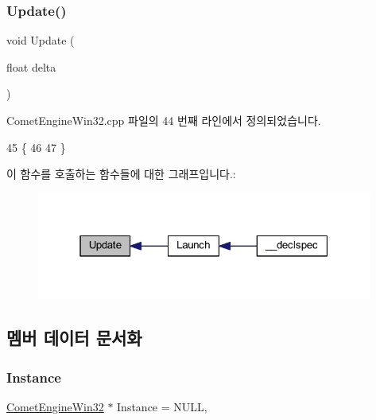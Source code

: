 \subsubsection{\texorpdfstring{Update()}{Update()}}
{\footnotesize\ttfamily void Update (\begin{DoxyParamCaption}\item[{float}]{delta }\end{DoxyParamCaption})\hspace{0.3cm}{\ttfamily [private]}}



Comet\+Engine\+Win32.\+cpp 파일의 44 번째 라인에서 정의되었습니다.


\begin{DoxyCode}
45 \{
46 
47 \}
\end{DoxyCode}
이 함수를 호출하는 함수들에 대한 그래프입니다.\+:\nopagebreak
\begin{figure}[H]
\begin{center}
\leavevmode
\includegraphics[width=313pt]{class_comet_engine_1_1_comet_engine_win32_a5ceefb272acf4d0adb4964ec29e5996e_icgraph}
\end{center}
\end{figure}


\subsection{멤버 데이터 문서화}
\mbox{\label{class_comet_engine_1_1_comet_engine_win32_ac980c50873d6df828203b639e543de14}} 
\subsubsection{\texorpdfstring{Instance}{Instance}}
{\footnotesize\ttfamily \hyperlink{class_comet_engine_1_1_comet_engine_win32}{Comet\+Engine\+Win32} $\ast$ Instance = N\+U\+LL\hspace{0.3cm}{\ttfamily [static]}, {\ttfamily [private]}}



